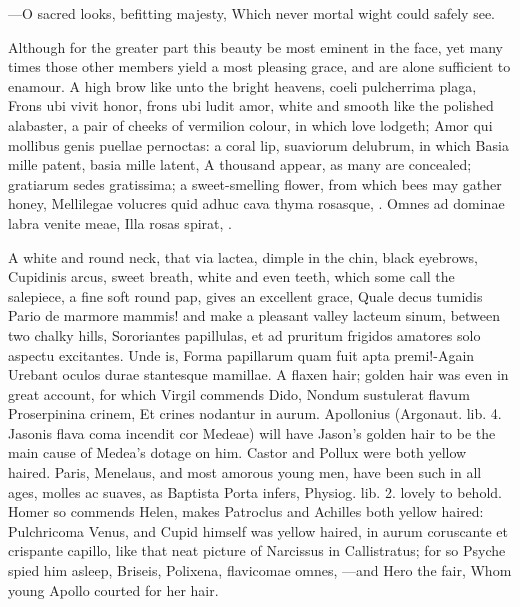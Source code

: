 {---O sacred looks, befitting majesty,
Which never mortal wight could safely see.

Although for the greater part this beauty be most eminent in the face,
yet many times those other members yield a most pleasing grace, and are
alone sufficient to enamour. A high brow like unto the bright heavens,
coeli pulcherrima plaga, Frons ubi vivit honor, frons ubi ludit amor,
white and smooth like the polished alabaster, a pair of cheeks of
vermilion colour, in which love lodgeth; Amor qui mollibus genis
puellae pernoctas: a coral lip, suaviorum delubrum, in which Basia
mille patent, basia mille latent, A thousand appear, as many are
concealed; gratiarum sedes gratissima; a sweet-smelling flower, from
which bees may gather honey, Mellilegae volucres quid adhuc cava
thyma rosasque, \etc{}.
Omnes ad dominae labra venite meae,
Illa rosas spirat, \etc{}.

A white and round neck, that via lactea, dimple in the chin, black
eyebrows, Cupidinis arcus, sweet breath, white and even teeth, which
some call the salepiece, a fine soft round pap, gives an excellent
grace, Quale decus tumidis Pario de marmore mammis! and
make a pleasant valley lacteum sinum, between two chalky hills,
Sororiantes papillulas, et ad pruritum frigidos amatores solo aspectu
excitantes. Unde is, Forma papillarum quam fuit apta premi!-Again
Urebant oculos durae stantesque mamillae. A flaxen hair; golden hair
was even in great account, for which Virgil commends Dido, Nondum
sustulerat flavum Proserpinina crinem, Et crines nodantur in aurum.
Apollonius (Argonaut. lib. 4. Jasonis flava coma incendit cor Medeae)
will have Jason's golden hair to be the main cause of Medea's dotage on
him. Castor and Pollux were both yellow haired. Paris, Menelaus, and
most amorous young men, have been such in all ages, molles ac suaves,
as Baptista Porta infers,  Physiog. lib. 2. lovely to behold.
Homer so commends Helen, makes Patroclus and Achilles both yellow
haired: Pulchricoma Venus, and Cupid himself was yellow haired, in
aurum coruscante et crispante capillo, like that neat picture of
Narcissus in Callistratus; for so Psyche spied him asleep,
Briseis, Polixena, \etc{} flavicomae omnes,
---and Hero the fair,
Whom young Apollo courted for her hair.

}
